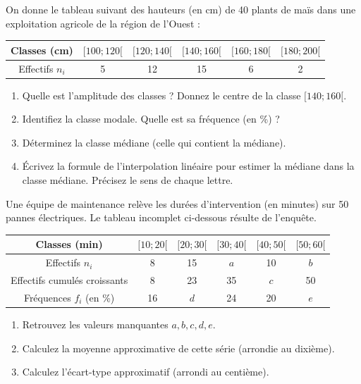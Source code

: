 \documentclass[11pt]{article}
\begin{document}
\begin{exercice}
On donne le tableau suivant des hauteurs (en cm) de 40 plants de maïs dans une exploitation agricole de la région de l'Ouest :

\begin{center}
\begin{tabular}{|c|c|c|c|c|c|}\hline
Classes (cm) & $[100;120[$ & $[120;140[$ & $[140;160[$ & $[160;180[$ & $[180;200[$ \\ \hline
Effectifs $n_i$ & 5 & 12 & 15 & 6 & 2 \\ \hline
\end{tabular}
\end{center}

\begin{enumerate}
    \item Quelle est l'amplitude des classes ? Donnez le centre de la classe $[140;160[$.
    \item Identifiez la classe modale. Quelle est sa fréquence (en \%) ?
    \item Déterminez la classe médiane (celle qui contient la médiane).
    \item Écrivez la formule de l'interpolation linéaire pour estimer la médiane dans la classe médiane. Précisez le sens de chaque lettre.
\end{enumerate}
\end{exercice}

\begin{exercice}
Une équipe de maintenance relève les durées d'intervention (en minutes) sur 50 pannes électriques. Le tableau incomplet ci-dessous résulte de l'enquête.

\begin{center}
\begin{tabular}{|c|c|c|c|c|c|}\hline
Classes (min) & $[10;20[$ & $[20;30[$ & $[30;40[$ & $[40;50[$ & $[50;60[$ \\ \hline
Effectifs $n_i$ & 8 & 15 & $a$ & 10 & $b$ \\ \hline
Effectifs cumulés croissants & 8 & 23 & 35 & $c$ & 50 \\ \hline
Fréquences $f_i$ (en \%) & 16 & $d$ & 24 & 20 & $e$ \\ \hline
\end{tabular}
\end{center}

\begin{enumerate}
    \item Retrouvez les valeurs manquantes $a, b, c, d, e$.
    \item Calculez la moyenne approximative de cette série (arrondie au dixième).
    \item Calculez l'écart-type approximatif (arrondi au centième).
\end{enumerate}
\end{exercice}
\end{document}
